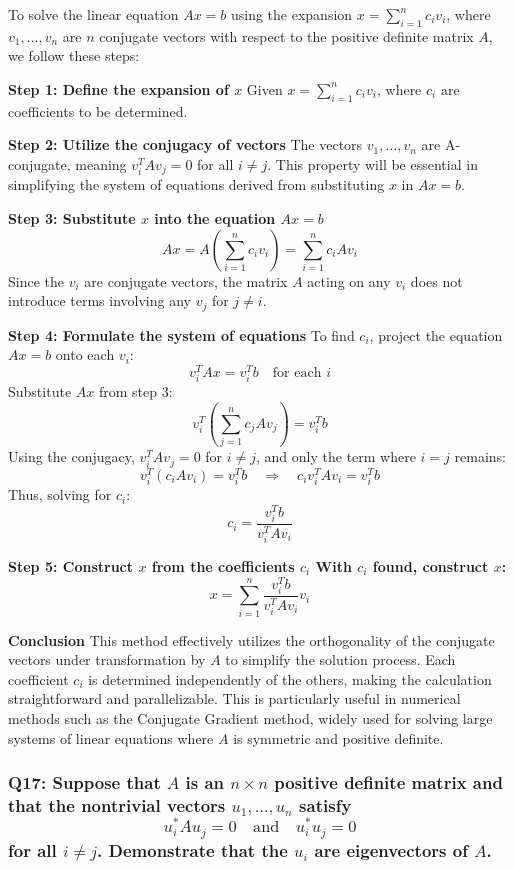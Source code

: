 \documentclass{article}
\begin{document}
To solve the linear equation \(Ax = b\) using the expansion \(x = \sum_{i=1}^n c_i v_i\), where \(v_1, \ldots, v_n\) are \(n\) conjugate vectors with respect to the positive definite matrix \(A\), we follow these steps:

\textbf{Step 1: Define the expansion of \(x\)}
Given \(x = \sum_{i=1}^n c_i v_i\), where \(c_i\) are coefficients to be determined.

\textbf{Step 2: Utilize the conjugacy of vectors}
The vectors \(v_1, \ldots, v_n\) are A-conjugate, meaning \(v_i^T A v_j = 0\) for all \(i \neq j\). This property will be essential in simplifying the system of equations derived from substituting \(x\) in \(Ax = b\).

\textbf{Step 3: Substitute \(x\) into the equation \(Ax = b\)}
\[
Ax = A\left(\sum_{i=1}^n c_i v_i\right) = \sum_{i=1}^n c_i Av_i
\]
Since the \(v_i\) are conjugate vectors, the matrix \(A\) acting on any \(v_i\) does not introduce terms involving any \(v_j\) for \(j \neq i\).

\textbf{Step 4: Formulate the system of equations}
To find \(c_i\), project the equation \(Ax = b\) onto each \(v_i\):
\[
v_i^T Ax = v_i^T b \quad \text{for each } i
\]
Substitute \(Ax\) from step 3:
\[
v_i^T \left(\sum_{j=1}^n c_j Av_j\right) = v_i^T b
\]
Using the conjugacy, \(v_i^T Av_j = 0\) for \(i \neq j\), and only the term where \(i = j\) remains:
\[
v_i^T (c_i Av_i) = v_i^T b \quad \Rightarrow \quad c_i v_i^T Av_i = v_i^T b
\]
Thus, solving for \(c_i\):
\[
c_i = \frac{v_i^T b}{v_i^T Av_i}
\]

\textbf{Step 5: Construct \(x\) from the coefficients \(c_i\)
With \(c_i\) found, construct \(x\):}
\[
x = \sum_{i=1}^n \frac{v_i^T b}{v_i^T Av_i} v_i
\]

\textbf{Conclusion}
This method effectively utilizes the orthogonality of the conjugate vectors under transformation by \(A\) to simplify the solution process. Each coefficient \(c_i\) is determined independently of the others, making the calculation straightforward and parallelizable. This is particularly useful in numerical methods such as the Conjugate Gradient method, widely used for solving large systems of linear equations where \(A\) is symmetric and positive definite.

\subsubsection*{Q17: Suppose that \(A\) is an \(n \times n\) positive definite matrix and that the nontrivial vectors \(u_1, \ldots, u_n\) satisfy
\[ u_i^* A u_j = 0 \quad \text{and} \quad u_i^* u_j = 0 \]
for all \(i \neq j\). Demonstrate that the \(u_i\) are eigenvectors of \(A\).}
\end{document}
